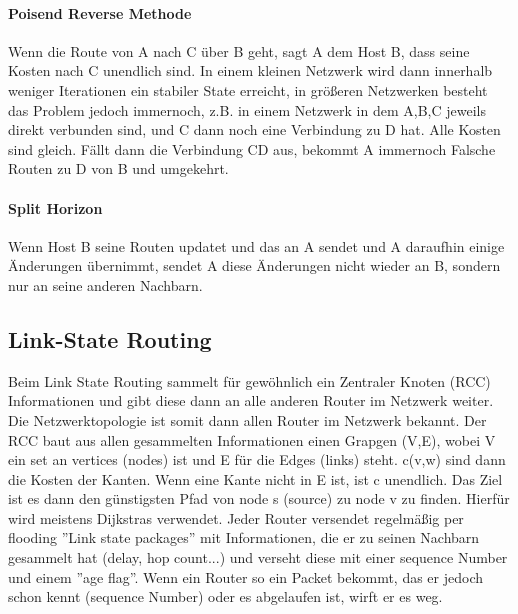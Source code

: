 			\paragraph{Poisend Reverse Methode} 
				Wenn die Route von A nach C über B geht, sagt A dem Host B, dass seine Kosten nach C unendlich sind. In einem kleinen Netzwerk wird dann innerhalb weniger Iterationen ein stabiler State erreicht, in größeren Netzwerken besteht das Problem jedoch immernoch, z.B. in einem Netzwerk in dem A,B,C jeweils direkt verbunden sind, und C dann noch eine Verbindung zu D hat. Alle Kosten sind gleich. Fällt dann die Verbindung CD aus, bekommt A immernoch Falsche Routen zu D von B und umgekehrt. 
			
			\paragraph{Split Horizon}
				Wenn Host B seine Routen updatet und das an A sendet und A daraufhin einige Änderungen übernimmt, sendet A diese Änderungen nicht wieder an B, sondern nur an seine anderen Nachbarn.
	
	\subsection{Link-State Routing}
		Beim Link State Routing sammelt für gewöhnlich ein Zentraler Knoten (RCC) Informationen und gibt diese dann an alle anderen Router im Netzwerk weiter. Die Netzwerktopologie ist somit dann allen Router im Netzwerk bekannt. Der RCC baut aus allen gesammelten Informationen einen Grapgen (V,E), wobei V ein set an vertices (nodes) ist und E für die Edges (links) steht.
		c(v,w) sind dann die Kosten der Kanten. Wenn eine Kante nicht in E ist, ist c unendlich. Das Ziel ist es dann den günstigsten Pfad von node s (source) zu node v zu finden. Hierfür wird meistens Dijkstras verwendet. Jeder Router versendet regelmäßig per flooding ''Link state packages'' mit Informationen, die er zu seinen Nachbarn gesammelt hat (delay, hop count...) und verseht diese mit einer sequence Number und einem ''age flag''. Wenn ein Router so ein Packet bekommt, das er jedoch schon kennt (sequence Number) oder es abgelaufen ist, wirft er es weg. 

